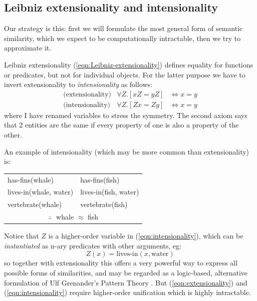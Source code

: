 \subsection{Leibniz extensionality and intensionality}

Our strategy is this:  first we will formulate the most general form of semantic similarity, which we expect to be computationally intractable, then we try to approximate it.

Leibniz extensionality (\ref{eqn:Leibniz-extensionality}) defines equality for functions or predicates, but not for individual objects.  For the latter purpose we have to invert extensionality to \textit{intensionality} as follows:
\begin{eqnarray}
\mbox{(extensionality)}    & \forall Z. [x Z  = y Z] & \Leftrightarrow x = y \label{eqn:extensionality} \\
\mbox{(intensionality)}     & \forall Z. [Z x  = Z y] & \Leftrightarrow x = y \label{eqn:intensionality}
\end{eqnarray}
where I have renamed variables to stress the symmetry.  The second axiom says that 2 entities are the same if every property of one is also a property of the other.

An example of intensionality (which may be more common than extensionality) is:

\tab \tab \tab
\begin{tabular}{l|l}
has-fins(whale)           & has-fins(fish)\\
lives-in(whale, water) & lives-in(fish, water)\\
vertebrate(whale)      & vertebrate(fish)\\
\hline
\multicolumn{2}{c}{$\therefore \;$ whale $\approx$ fish}
\end{tabular}

Notice that $Z$ is a higher-order variable in (\ref{eqn:intensionality}), which can be \textit{instantiated} as n-ary predicates with other arguments, eg:
 $$Z(x) = \mbox{lives-in}(x, \mbox{water})$$
so together with extensionality this offers a very powerful way to express all possible forms of similarities, and may be regarded as a logic-based, alternative formulation of Ulf Grenander's Pattern Theory \citep*{Grenander2007}.  But (\ref{eqn:extensionality}) and (\ref{eqn:intensionality}) require higher-order unification which is highly intractable.

